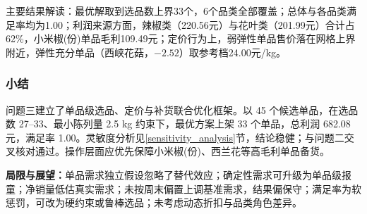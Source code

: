主要结果解读：最优解取到选品数上界33个，6个品类全部覆盖；总体与各品类满足率均为1.00；利润来源方面，辣椒类（220.56元）与花叶类（201.99元）合计占62\%，小米椒(份)单品毛利109.49元；定价行为上，弱弹性单品售价落在网格上界附近，弹性充分单品（西峡花菇，$-2.52$）取参考档24.00元/kg。

\subsubsection{小结}

问题三建立了单品级选品、定价与补货联合优化框架。以 45 个候选单品，在选品数 27--33、最小陈列量 2.5 kg 约束下，最优方案上架 33 个单品，总利润 682.08 元，满足率 1.00。灵敏度分析见\ref{sensitivity_analysis}节，结论稳健；与问题二交叉核对通过。操作层面应优先保障小米椒(份)、西兰花等高毛利单品备货。

\textbf{局限与展望：}单品需求独立假设忽略了替代效应\cite{kok2007,vanryzin1999}；确定性需求可升级为单品级报童\cite{federgruen1999,petruzzi1999}；净销量低估真实需求\cite{agrawal1996}；未按周末偏置上调基准需求，结果偏保守；满足率为软惩罚，可改为硬约束或鲁棒选品\cite{vanryzin1999,rusmevichientong2012}；未考虑动态折扣与品类角色差异。

